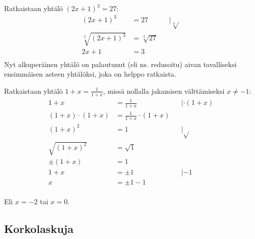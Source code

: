 \begin{esimerkki}
Ratkaistaan yhtälö $(2x+1)^3=27$:
	\begin{align*}
	(2x+1)^3&=27 &&|\sqrt[3]{} \\
	\sqrt[3]{(2x+1)^3}&=\sqrt[3]{27} \\
	2x+1&=3 \\
	\end{align*}
Nyt alkuperäinen yhtälö on palautunut (eli ns. redusoitu) aivan tavalliseksi ensimmäisen asteen yhtälöksi, joka on helppo ratkaista.
\end{esimerkki}

\begin{esimerkki}
Ratkaistaan yhtälö $1+x=\frac{1}{1+x}$, missä nollalla jakamisen välttämiseksi $x\neq-1$:
	\begin{align*}
	1+x&=\frac{1}{1+x} &&| \cdot(1+x) \\
	(1+x)\cdot(1+x)&=\frac{1}{1+x}\cdot(1+x) \\
	(1+x)^2&=1 && |\sqrt{ } \\
	\sqrt{(1+x)^2}&=\sqrt{1} &&\\
	\pm (1+x)&=1&& \\
	1+x &= \pm 1 &&|-1 \\
	x &=\pm 1 -1	 && \\
	\end{align*}

Eli $x=-2$ tai $x=0$.
\end{esimerkki}

\subsection*{Korkolaskuja}

